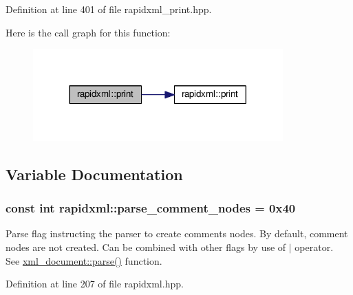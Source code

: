 Definition at line 401 of file rapidxml\+\_\+print.\+hpp.



Here is the call graph for this function\+:
\nopagebreak
\begin{figure}[H]
\begin{center}
\leavevmode
\includegraphics[width=272pt]{namespacerapidxml_a0d2e114d5dd85e13c23b8dab600720fe_cgraph}
\end{center}
\end{figure}




\subsection{Variable Documentation}
\subsubsection[{\texorpdfstring{parse\+\_\+comment\+\_\+nodes}{parse_comment_nodes}}]{\setlength{\rightskip}{0pt plus 5cm}const int rapidxml\+::parse\+\_\+comment\+\_\+nodes = 0x40}\hypertarget{namespacerapidxml_ae093dd49e2f59fa39eee95f1a6568e32}{}\label{namespacerapidxml_ae093dd49e2f59fa39eee95f1a6568e32}
Parse flag instructing the parser to create comments nodes. By default, comment nodes are not created. Can be combined with other flags by use of $\vert$ operator. ~\newline
~\newline
 See \hyperlink{classrapidxml_1_1xml__document_ac6e73ff9ac323bf5a370c38feb03a6b1}{xml\+\_\+document\+::parse()} function. 

Definition at line 207 of file rapidxml.\+hpp.

